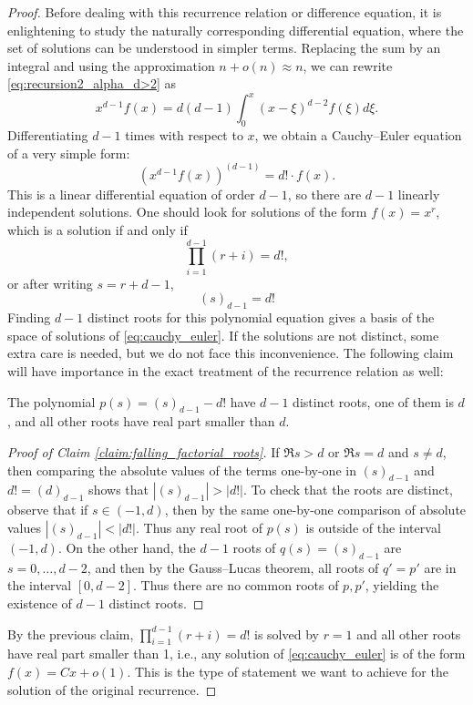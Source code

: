 \documentclass[10pt,a4paper]{amsart}
\begin{document}
\begin{proof}
    Before dealing with this recurrence relation or difference equation, it is enlightening to study the naturally corresponding differential equation, where the set of solutions can be understood in simpler terms. Replacing the sum by an integral and using the approximation $n+o(n)\approx n$, we can rewrite \eqref{eq:recursion2_alpha_d>2} as
    $$x^{d-1}f(x)=d(d-1)\int_{0}^{x}(x-\xi)^{d-2}f(\xi)d\xi.$$
    Differentiating $d-1$ times with respect to $x$, we obtain a Cauchy--Euler equation of a very simple form:
    \begin{equation}\label{eq:cauchy_euler}
    \left(x^{d-1}f(x)\right)^{(d-1)}=d! \cdot f(x).
    \end{equation}
    This is a linear differential equation of order $d-1$, so there are $d-1$ linearly independent solutions. One should look for solutions of the form $f(x)=x^r$, which is a solution if and only if
    $$\prod_{i=1}^{d-1}(r+i)=d!,$$
    or after writing $s=r+d-1$,
    $$(s)_{d-1}=d!$$
    Finding $d-1$ distinct roots for this polynomial equation gives a basis of the space of solutions of \eqref{eq:cauchy_euler}. If the solutions are not distinct, some extra care is needed, but we do not face this inconvenience. The following claim will have importance in the exact treatment of the recurrence relation as well:

    \begin{claim}\label{claim:falling_factorial_roots}
    The polynomial $p(s)=(s)_{d-1}-d!$ have $d-1$ distinct roots, one of them is $d$, and all other roots have real part smaller than $d$.
    \end{claim}

    \begin{proof}[Proof of Claim \ref{claim:falling_factorial_roots}]
        If $\Re s>d$ or $\Re s = d$ and $s\neq d$, then comparing the absolute values of the terms one-by-one in $(s)_{d-1}$ and $d!=(d)_{d-1}$ shows that $|(s)_{d-1}|>|d!|$. To check that the roots are distinct, observe that if $s\in (-1, d)$, then by the same one-by-one comparison of absolute values $|(s)_{d-1}|<|d!|$. Thus any real root of $p(s)$ is outside of the interval $(-1, d)$. On the other hand, the $d-1$ roots of $q(s)=(s)_{d-1}$ are $s=0, \dots, d-2$, and then by the Gauss--Lucas theorem, all roots of $q'=p'$ are in the interval $[0, d-2]$. Thus there are no common roots of $p, p'$, yielding the existence of $d-1$ distinct roots.
    \end{proof}

    By the previous claim, $\prod_{i=1}^{d-1}(r+i)=d!$ is solved by $r=1$ and all other roots have real part smaller than 1, i.e., any solution of \eqref{eq:cauchy_euler} is of the form $f(x)=Cx+o(1)$. This is the type of statement we want to achieve for the solution of the original recurrence.


\end{proof}
\end{document}
